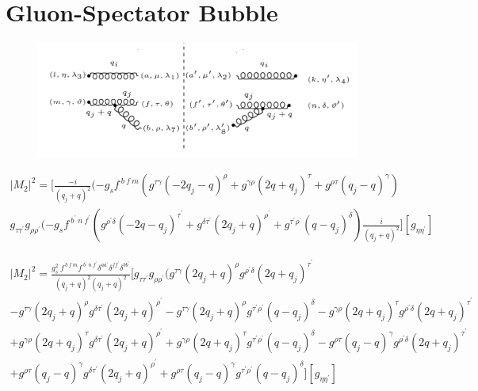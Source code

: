 \section{Gluon-Spectator Bubble}
\begin{figure}[ht!]
\centering
\includegraphics[width=0.95\textwidth]{images/GG/M2Squer}
\end{figure}
\begin{equation}
\begin{split}
|M_2|^2=[\frac{-i}{(q_j +q)^2}(-g_s f^{\:b\:f\:m}(g^{{\tau}{\gamma}}(-2q_j-q)^{\rho}+g^{{\gamma}{\rho}}(2q +q_j)^{\tau}+g^{{\rho}{\tau}}(q_j -q)^{\gamma})\\g_{{\tau}{{\tau}^{\prime}}}g_{{\rho}{{\rho}^{\prime}}}
(-g_s f^{\:b^{\prime}\:n\:f^{\prime}}(g^{{{\rho}^{\prime}}{{\delta}}}(-2q-q_j)^{{\tau}^{\prime}}+g^{{{\delta}}{{\tau}^{\prime}}}(2q_j +q)^{{\rho}^{\prime}}+g^{{{\tau}^{\prime}}{{\rho}^{\prime}}}(q-q_j)^{{\delta}})\frac{i}{(q_j +q)^2}][g_{{\eta}{{\eta}^{\prime}}}]
\end{split}
\end{equation}

\begin{equation}
\begin{split}
|M_2|^2=\frac{g_s^2\: f^{\:b\:f\:m} f^{\:b^{\prime}\:n\:f^{\prime}} {\delta}^{{a}{a^{\prime}}} {\delta}^{{f}{f^{\prime}}} {\delta}^{{b}{b^{\prime}}}}{(q_j +q)^2 (q_j +q)^2}[g_{{\tau}{{\tau}^{\prime}}}g_{{\rho}{{\rho}^{\prime}}}(g^{{\tau}{\gamma}}(2q_j+q)^{\rho}g^{{{\rho}^{\prime}}{{\delta}}}(2q+q_j)^{{\tau}^{\prime}}\\
-g^{{\tau}{\gamma}}(2q_j+q)^{\rho}g^{{{\delta}}{{\tau}^{\prime}}}(2q_j +q)^{{\rho}^{\prime}}-g^{{\tau}{\gamma}}(2q_j+q)^{\rho}g^{{{\tau}^{\prime}}{{\rho}^{\prime}}}(q-q_j)^{{\delta}}-g^{{\gamma}{\rho}}(2q +q_j)^{\tau}g^{{{\rho}^{\prime}}{{\delta}}}(2q+q_j)^{{\tau}^{\prime}}\\
+g^{{\gamma}{\rho}}(2q +q_j)^{\tau}g^{{{\delta}}{{\tau}^{\prime}}}(2q_j +q)^{{\rho}^{\prime}}+g^{{\gamma}{\rho}}(2q +q_j)^{\tau}g^{{{\tau}^{\prime}}{{\rho}^{\prime}}}(q-q_j)^{{\delta}}-g^{{\rho}{\tau}}(q_j -q)^{\gamma}g^{{{\rho}^{\prime}}{{\delta}}}(2q+q_j)^{{\tau}^{\prime}}\\
+g^{{\rho}{\tau}}(q_j -q)^{\gamma}g^{{{\delta}}{{\tau}^{\prime}}}(2q_j +q)^{{\rho}^{\prime}}
+g^{{\rho}{\tau}}(q_j -q)^{\gamma}g^{{{\tau}^{\prime}}{{\rho}^{\prime}}}(q-q_j)^{{\delta}}
][g_{{\eta}{{\eta}^{\prime}}}]
\end{split}
\end{equation}



